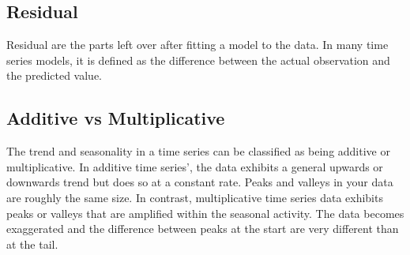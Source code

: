 \documentclass{article}
\begin{document}
  \subsection{Residual}
  Residual are the parts left over after fitting a model to the data. In many time series models, it is defined as the difference between the actual observation and the predicted value.
  
  \subsection{Additive vs Multiplicative}
  The trend and seasonality in a time series can be classified as being additive or multiplicative.
  In additive time series', the data exhibits a general upwards or downwards trend but does so at a constant rate. Peaks and valleys in your data are roughly the same size.
  In contrast, multiplicative time series data exhibits peaks or valleys that are amplified within the seasonal activity. The data becomes exaggerated and the difference between peaks at the start are very different than at the tail.
  \newpage
\end{document}
